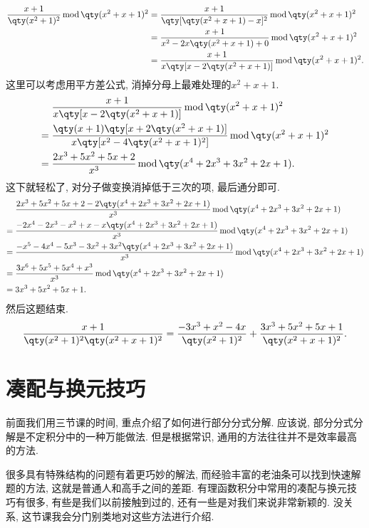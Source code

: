 \documentclass{ctexbook}
\newcommand{\m}{\,\mathrm{mod}\,}
\begin{document}
{\begin{align*}
\frac{x+1}{\qty(x^{2}+1)^{2}}\m\qty(x^{2}+x+1)^{2}={}&\frac{x+1}{\qty[\qty(x^{2}+x+1)-x]^{2}}\m\qty(x^{2}+x+1)^{2}\\
={}&\frac{x+1}{x^{2}-2x\qty(x^{2}+x+1)+0}\m\qty(x^{2}+x+1)^{2}\\
={}&\frac{x+1}{x\qty[x-2\qty(x^{2}+x+1)]}\m\qty(x^{2}+x+1)^{2}
.\end{align*}
这里可以考虑用平方差公式, 消掉分母上最难处理的$x^{2}+x+1$. 
\begin{align*}
{}&\frac{x+1}{x\qty[x-2\qty(x^{2}+x+1)]}\m\qty(x^{2}+x+1)^{2}\\
={}&\frac{\qty(x+1)\qty[x+2\qty(x^{2}+x+1)]}{x\qty[x^{2}-4\qty(x^{2}+x+1)^{2}]}\m\qty(x^{2}+x+1)^{2}\\
={}&\frac{2x^{3}+5x^{2}+5x+2}{x^{3}}\m\qty(x^{4}+2x^{3}+3x^{2}+2x+1)
.\end{align*}
这下就轻松了, 对分子做变换消掉低于三次的项, 最后通分即可. 
\begin{align*}
{}&\frac{2x^{3}+5x^{2}+5x+2-2\qty(x^{4}+2x^{3}+3x^{2}+2x+1)}{x^{3}}\m\qty(x^{4}+2x^{3}+3x^{2}+2x+1)\\
={}&\frac{-2x^{4}-2x^{3}-x^{2}+x-x\qty(x^{4}+2x^{3}+3x^{2}+2x+1)}{x^{3}}\m\qty(x^{4}+2x^{3}+3x^{2}+2x+1)\\
={}&\frac{-x^{5}-4x^{4}-5x^{3}-3x^{2}+3x^{2}\qty(x^{4}+2x^{3}+3x^{2}+2x+1)}{x^{3}}\m\qty(x^{4}+2x^{3}+3x^{2}+2x+1)\\
={}&\frac{3x^{6}+5x^{5}+5x^{4}+x^{3}}{x^{3}}\m\qty(x^{4}+2x^{3}+3x^{2}+2x+1)\\
={}&3x^{3}+5x^{2}+5x+1
.\end{align*}
然后这题结束. 
\begin{align*}
\frac{x+1}{\qty(x^{2}+1)^{2}\qty(x^{2}+x+1)^{2}}=\frac{-3x^{3}+x^{2}-4x}{\qty(x^{2}+1)^{2}}+\frac{3x^{3}+5x^{2}+5x+1}{\qty(x^{2}+x+1)^{2}}
.\end{align*}
\section{凑配与换元技巧}
前面我们用三节课的时间, 重点介绍了如何进行部分分式分解. 应该说, 部分分式分解是不定积分中的一种万能做法. 但是根据常识, 通用的方法往往并不是效率最高的方法. \par
很多具有特殊结构的问题有着更巧妙的解法, 而经验丰富的老油条可以找到快速解题的方法, 这就是普通人和高手之间的差距. 有理函数积分中常用的凑配与换元技巧有很多, 有些是我们以前接触到过的, 还有一些是对我们来说非常新颖的. 没关系, 这节课我会分门别类地对这些方法进行介绍. \par
}
\end{document}
